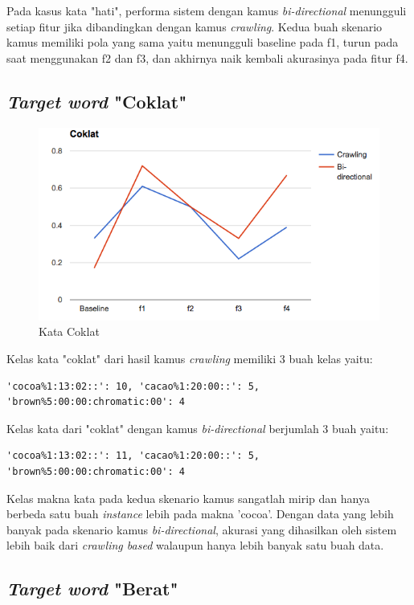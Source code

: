 Pada kasus kata "hati", performa sistem dengan kamus \textit{bi-directional} menungguli setiap fitur jika dibandingkan dengan kamus \textit{crawling}. Kedua buah skenario kamus memiliki pola yang sama yaitu menungguli baseline pada f1, turun pada saat menggunakan f2 dan f3, dan akhirnya naik kembali akurasinya pada fitur f4. 

\subsection{\textit{Target word} "Coklat"}

\begin{figure}
	\centering
	\includegraphics[width=1\linewidth]{adit_pics/coklat.png}
	\caption{Kata Coklat}
	\label{fig:coklat}
\end{figure}

Kelas kata "coklat" dari hasil kamus \textit{crawling} memiliki 3 buah kelas yaitu:
\begin{lstlisting}
'cocoa%1:13:02::': 10, 'cacao%1:20:00::': 5, 'brown%5:00:00:chromatic:00': 4
\end{lstlisting}
Kelas kata dari "coklat" dengan kamus \textit{bi-directional} berjumlah 3 buah yaitu:
\begin{lstlisting}
'cocoa%1:13:02::': 11, 'cacao%1:20:00::': 5, 'brown%5:00:00:chromatic:00': 4
\end{lstlisting}

Kelas makna kata pada kedua skenario kamus sangatlah mirip dan hanya berbeda satu buah \textit{instance} lebih pada makna 'cocoa'. Dengan data yang lebih banyak pada skenario kamus \textit{bi-directional}, akurasi yang dihasilkan oleh sistem lebih baik dari \textit{crawling based} walaupun hanya lebih banyak satu buah data.

\subsection{\textit{Target word} "Berat"}

